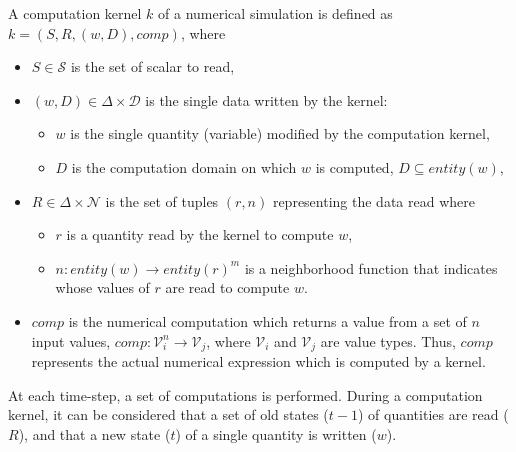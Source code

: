 \begin{mydef}
A computation kernel $k$ of a numerical simulation is defined as $k=(S,R,(w,D),comp)$, where
\begin{itemize}
\item $S \in \mathcal{S}$ is the set of scalar to read,
\item $(w,D) \in \Delta \times \mathcal{D}$ is the single data written by the kernel:
\begin{itemize}
  \item $w$ is the single quantity (variable) modified by the computation kernel,
  \item $D$ is the computation domain on which $w$ is computed, $D \subseteq entity(w)$,
\end{itemize}
\item $R \in \Delta \times \mathcal{N}$ is the set of tuples $(r,n)$ representing the data read where
\begin{itemize}
  \item $r$ is a quantity read by the kernel to compute $w$,
  \item $n : entity(w) \rightarrow entity(r)^m$ is a neighborhood function that indicates whose values of $r$ are read to compute $w$.
\end{itemize}
\item $comp$ is the numerical computation which returns a value from a set of $n$ input values, $comp: \mathcal{V}_i^n \rightarrow \mathcal{V}_j$, where $\mathcal{V}_i$ and $\mathcal{V}_j$ are value types. Thus, $comp$ represents the actual numerical expression which is computed by a kernel.
\end{itemize}
\end{mydef}

At each time-step, a set of computations is performed. During a computation kernel, it can be considered that a set of old states ($t-1$) of quantities are read ($R$), and that a new state ($t$) of a single quantity is written ($w$).

